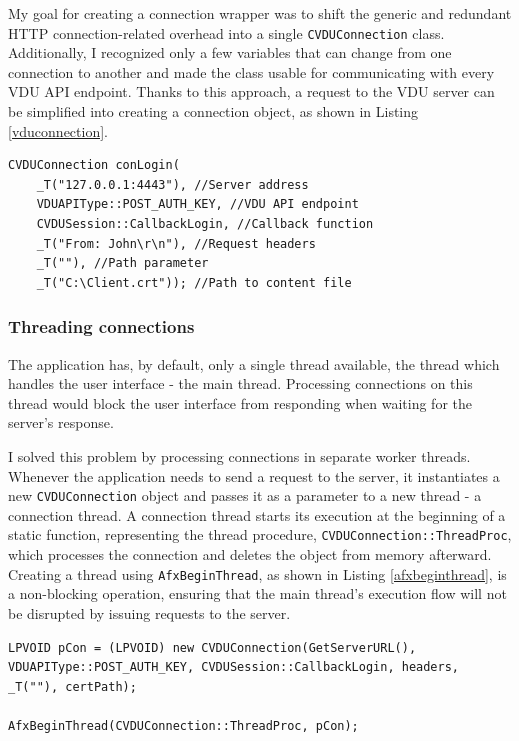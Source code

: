 My goal for creating a connection wrapper was to shift the generic and redundant HTTP connection-related overhead into a single \lstinline{CVDUConnection} class. Additionally, I recognized only a few variables that can change from one connection to another and made the class usable for communicating with every VDU API endpoint. Thanks to this approach, a request to the VDU server can be simplified into creating a connection object, as shown in Listing \ref{vduconnection}.
\begin{lstlisting}[caption={Example of instantiating a VDU connection wrapper class.}, label=vduconnection]
CVDUConnection conLogin(
    _T("127.0.0.1:4443"), //Server address
    VDUAPIType::POST_AUTH_KEY, //VDU API endpoint
    CVDUSession::CallbackLogin, //Callback function
    _T("From: John\r\n"), //Request headers
    _T(""), //Path parameter
    _T("C:\Client.crt")); //Path to content file
\end{lstlisting}
\subsubsection{Threading connections}
The application has, by default, only a single thread available, the thread which handles the user interface - the main thread. Processing connections on this thread would block the user interface from responding when waiting for the server's response.

I solved this problem by processing connections in separate worker threads. Whenever the application needs to send a request to the server, it instantiates a new \lstinline{CVDUConnection} object and passes it as a parameter to a new thread - a connection thread. A connection thread starts its execution at the beginning of a static function, representing the thread procedure, \lstinline{CVDUConnection::ThreadProc}, which processes the connection and deletes the object from memory afterward. Creating a thread using \lstinline{AfxBeginThread}, as shown in Listing \ref{afxbeginthread}, is a non-blocking operation, ensuring that the main thread's execution flow will not be disrupted by issuing requests to the server.
\begin{lstlisting}[caption={Creating a new thread to process a connecton which sends a login request to the server.}, label=afxbeginthread]
LPVOID pCon = (LPVOID) new CVDUConnection(GetServerURL(), VDUAPIType::POST_AUTH_KEY, CVDUSession::CallbackLogin, headers, _T(""), certPath);

AfxBeginThread(CVDUConnection::ThreadProc, pCon);
\end{lstlisting}

